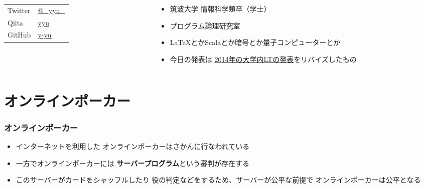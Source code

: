 \begin{frame}
\begin{columns}
\begin{column}{0.4\textwidth}
      \begin{table}[h]
        \begin{tabular}{ll}
          Twitter & \href{https://twitter.com/\_yyu\_}{@\_yyu\_} \\
          Qiita &  \href{https://qiita.com/yyu}{yyu} \\
          GitHub &  \href{https://github.com/y-yu}{y-yu} \\
        \end{tabular}
      \end{table}
    \end{column}
    \begin{column}{0.6\textwidth}
      \pause
      \begin{itemize}
        \item 筑波大学 情報科学類卒（学士）
        \item プログラム論理研究室
        \item<+-> \LaTeX とかScalaとか暗号とか量子コンピューターとか

        \item<+-> 今日の発表は
        \href{https://atnd.org/events/51236}{2014年の大学内LTの発表}をリバイズしたもの
      \end{itemize}
    \end{column}
  \end{columns}
\end{frame}

\section{オンラインポーカー}

\begin{frame}
  \frametitle{オンラインポーカー}

  \pause
  \begin{itemize}
    \item<+-> インターネットを利用した
    オンラインポーカーはさかんに行なわれている

    \item<+-> 一方でオンラインポーカーには
    \textbf{サーバープログラム}という審判が存在する

    \item<+-> このサーバーがカードをシャッフルしたり
    役の判定などをするため、サーバーが公平な前提で
    オンラインポーカーは公平となる
  \end{itemize}
\end{frame}

